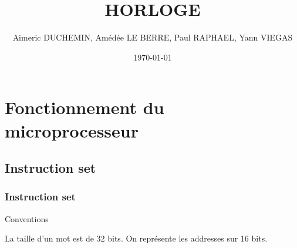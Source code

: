 \documentclass[12pt]{beamer}
\title{HORLOGE}
\author{Aimeric DUCHEMIN, Amédée LE BERRE, Paul RAPHAEL, Yann VIEGAS}
\institute{ENS Ulm}
\date{\today}
\begin{document}

\frame{\titlepage} %



\section{Fonctionnement du microprocesseur}
\subsection{Instruction set}

\begin{frame}
\frametitle{Instruction set}

\begin{prop}{Conventions}{}

    La taille d'un mot est de 32 bits.
    On représente les addresses sur 16 bits.\\
    
\end{prop}
\end{frame}
\end{document}
